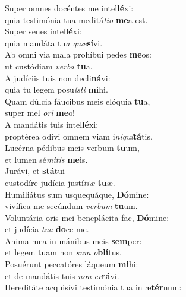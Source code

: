 \oddverse Super omnes docéntes me intel\textbf{lé}xi:~\*\\
\oddverse quia testimónia tua meditá\textit{ti}\textit{o} \textbf{me}a est.\\
\evenverse Super senes intel\textbf{lé}xi:~\*\\
\evenverse quia mandáta tu\textit{a} \textit{quæ}\textbf{sí}vi.\\
\oddverse Ab omni via mala prohíbui pedes \textbf{me}os:~\*\\
\oddverse ut custódiam \textit{ver}\textit{ba} \textbf{tu}a.\\
\evenverse A judíciis tuis non decli\textbf{ná}vi:~\*\\
\evenverse quia tu legem posu\textit{í}\textit{sti} \textbf{mi}hi.\\
\oddverse Quam dúlcia fáucibus meis elóquia \textbf{tu}a,~\*\\
\oddverse super mel \textit{o}\textit{ri} \textbf{me}o!\\
\evenverse A mandátis tuis intel\textbf{lé}xi:~\*\\
\evenverse proptérea odívi omnem viam i\textit{ni}\textit{qui}\textbf{tá}tis.\\
\oddverse Lucérna pédibus meis verbum \textbf{tu}um,~\*\\
\oddverse et lumen sé\textit{mi}\textit{tis} \textbf{me}is.\\
\evenverse Jurávi, et \textbf{stá}tui~\*\\
\evenverse custodíre judícia justí\textit{ti}\textit{æ} \textbf{tu}æ.\\
\oddverse Humiliátus sum usquequáque, \textbf{Dó}mine:~\*\\
\oddverse vivífica me secúndum \textit{ver}\textit{bum} \textbf{tu}um.\\
\evenverse Voluntária oris mei beneplácita fac, \textbf{Dó}mine:~\*\\
\evenverse et judícia \textit{tu}\textit{a} \textbf{do}ce me.\\
\oddverse Anima mea in mánibus meis \textbf{sem}per:~\*\\
\oddverse et legem tuam non \textit{sum} \textit{o}\textbf{blí}tus.\\
\evenverse Posuérunt peccatóres láqueum \textbf{mi}hi:~\*\\
\evenverse et de mandátis tuis \textit{non} \textit{er}\textbf{rá}vi.\\
\oddverse Hereditáte acquisívi testimónia tua in æ\textbf{tér}num:~\*\\
